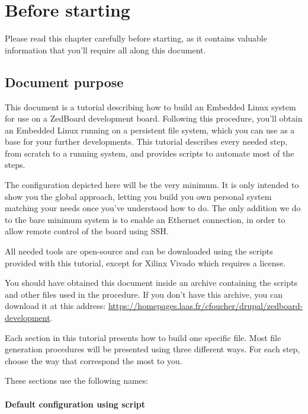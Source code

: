 \documentclass[openany,a4paper]{book}
\begin{document}


\chapter{Before starting}

Please read this chapter carefully before starting, as it contains valuable information that you'll require all along this document.

\section{Document purpose}

This document is a tutorial describing how to build an Embedded Linux system for use on a ZedBoard development board.
Following this procedure, you'll obtain an Embedded Linux running on a persistent file system, which you can use as a base for your further developments.
This tutorial describes every needed step, from scratch to a running system, and provides scripts to automate most of the steps.

The configuration depicted here will be the very minimum.
It is only intended to show you the global approach, letting you build you own personal system matching your needs once you've understood how to do.
The only addition we do to the bare minimum system is to enable an Ethernet connection, in order to allow remote control of the board using SSH.

All needed tools are open-source and can be downloaded using the scripts provided with this tutorial, except for Xilinx Vivado which requires a license.

You should have obtained this document inside an archive containing the scripts and other files used in the procedure.
If you don't have this archive, you can download it at this address: \url{https://homepages.laas.fr/cfoucher/drupal/zedboard-development}.

Each section in this tutorial presents how to build one specific file.
Most file generation procedures will be presented using three different ways.
For each step, choose the way that correspond the most to you.

These sections use the following names:

\subsubsection{Default configuration using script}
\end{document}
